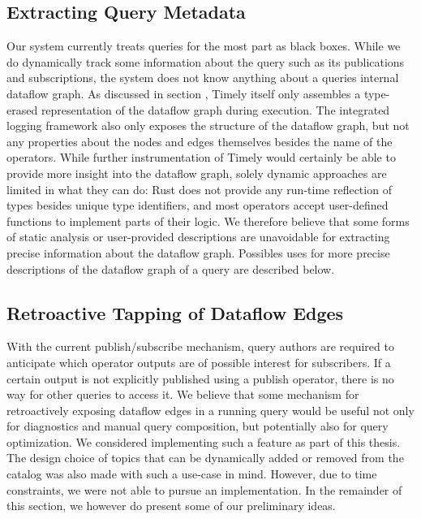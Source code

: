 \subsection{Extracting Query Metadata}

Our system currently treats queries for the most part as black boxes. While we
do dynamically track some information about the query such as its publications
and subscriptions, the system does not know anything about a queries internal
dataflow graph. As discussed in section , Timely
itself only assembles a type-erased representation of the dataflow graph
during execution. The integrated logging framework also only exposes the
structure of the dataflow graph, but not any properties about the nodes and
edges themselves besides the name of the operators. While further instrumentation
of Timely would certainly be able to provide more insight into the dataflow
graph, solely dynamic approaches are limited in what they can do:
Rust does not provide any run-time reflection of types besides unique type
identifiers, and most operators accept user-defined functions to implement
parts of their logic. We therefore believe that some forms of static analysis
or user-provided descriptions are unavoidable for extracting precise information
about the dataflow graph. Possibles uses for more precise descriptions of the
dataflow graph of a query are described below.

\subsection{Retroactive Tapping of Dataflow Edges}

With the current publish/subscribe mechanism, query authors are required to
anticipate which operator outputs are of possible interest for subscribers. If
a certain output is not explicitly published using a publish operator, there
is no way for other queries to access it. We believe that some mechanism for
retroactively exposing dataflow edges in a running query would be useful not
only for diagnostics and manual query composition, but potentially also
for query optimization. We considered implementing such a feature as part
of this thesis. The design choice of topics that can be dynamically added
or removed from the catalog was also made with such a use-case in mind.
However, due to time constraints, we were not able to pursue an implementation.
In the remainder of this section, we however do present some of our
preliminary ideas.


